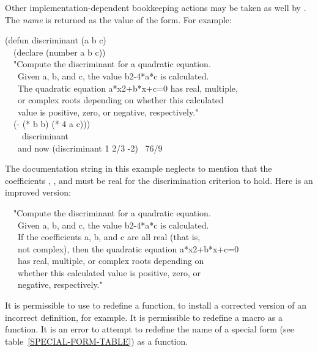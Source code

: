 \begin{defmac}
Other implementation-dependent bookkeeping actions may be taken as well
by .  The \emph{name} is returned as the value of the 
form.
For example:
\begin{lisp}
(defun discriminant (a b c) \\
~~(declare (number a b c)) \\
~~"Compute the discriminant for a quadratic equation. \\
~~~Given a, b, and c, the value b{\Xcircumflex}2-4*a*c is calculated. \\
~~~The quadratic equation a*x{\Xcircumflex}2+b*x+c=0 has real, multiple, \\
~~~or complex roots depending on whether this calculated \\
~~~value is positive, zero, or negative, respectively." \\
~~(- (* b b) (* 4 a c))) \\
~~~\EV\ discriminant \\
~~~\textrm{and now} (discriminant 1 2/3 -2) \EV\ 76/9
\end{lisp}
\begin{new}%
The documentation string in this example neglects to mention that the
coefficients , , and 
must be real for the discrimination criterion to hold.
Here is an improved version:
\begin{lisp}
~~"Compute the discriminant for a quadratic equation. \\
~~~Given a, b, and c, the value b{\Xcircumflex}2-4*a*c is calculated. \\
~~~If the coefficients a, b, and c are all real (that is, \\
~~~not complex), then the quadratic equation a*x{\Xcircumflex}2+b*x+c=0 \\
~~~has real, multiple, or complex roots depending on \\
~~~whether this calculated value is positive, zero, or \\
~~~negative, respectively."
\end{lisp}
\end{new}

It is permissible to use  to redefine a function,
to install a corrected version of an incorrect definition, for example.
It is permissible to redefine a macro as a function.
It is an error to attempt to redefine the name of a special
form (see table~\ref{SPECIAL-FORM-TABLE}) as a function.
\end{defmac}

